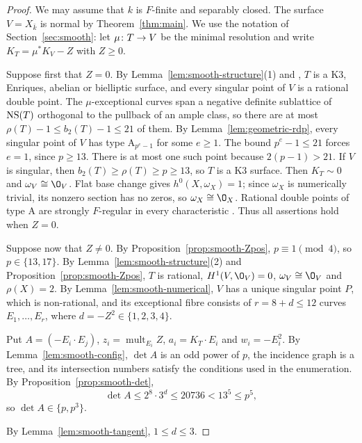 \begin{proof}
We may assume that $k$ is $F$-finite and separably closed.
The surface $V = X_{\bar k}$ is normal by Theorem~\ref{thm:main}.
We use the notation of Section~\ref{sec:smooth}: let $\mu\colon T\to V$ be the minimal resolution and write $K_T = \mu^*K_V-Z$ with $Z\geq 0$.

Suppose first that $Z = 0$.
By Lemma~\ref{lem:smooth-structure}(1) and \cite{BM77}, $T$ is a K3, Enriques, abelian or bielliptic surface, and every singular point of $V$ is a rational double point.
The $\mu$-exceptional curves span a negative definite sublattice of $\operatorname{NS}(T)$ orthogonal to the pullback of an ample class, so there are at most $\rho(T)-1\leq b_2(T)-1\leq 21$ of them.
By Lemma~\ref{lem:geometric-rdp}, every singular point of $V$ has type $\mathrm A_{p^e-1}$ for some $e\geq 1$.
The bound $p^e-1\leq 21$ forces $e = 1$, since $p\geq 13$.
There is at most one such point because $2(p-1)>21$.
If $V$ is singular, then $b_2(T)\geq\rho(T)\geq p\geq 13$, so $T$ is a K3 surface.
Then $K_T\sim 0$ and $\omega_V\cong\O_V$.
Flat base change gives $h^0(X,\omega_X) = 1$; since $\omega_X$ is numerically trivial, its nonzero section has no zeros, so $\omega_X\cong\O_X$.
Rational double points of type $\mathrm A$ are strongly $F$-regular in every characteristic \cite[Theorem~1.1]{Har98}.
Thus all assertions hold when $Z = 0$.

Suppose now that $Z\neq 0$.
By Proposition~\ref{prop:smooth-Zpos}, $p\equiv 1\pmod 4$, so $p\in\{13,17\}$.
By Lemma~\ref{lem:smooth-structure}(2) and Proposition~\ref{prop:smooth-Zpos}, $T$ is rational, $H^1(V,\O_V) = 0$, $\omega_V\cong\O_V$ and $\rho(X) = 2$.
By Lemma~\ref{lem:smooth-numerical}, $V$ has a unique singular point $P$, which is non-rational, and its exceptional fibre consists of $r = 8+d\leq 12$ curves $E_1,\dots,E_r$, where $d = -Z^2\in\{1,2,3,4\}$.

Put $A = (-E_i\cdot E_j)$, $z_i = \operatorname{mult}_{E_i}Z$, $a_i = K_T\cdot E_i$ and $w_i = -E_i^2$.
By Lemma~\ref{lem:smooth-config}, $\det A$ is an odd power of $p$, the incidence graph is a tree, and its intersection numbers satisfy the conditions used in the enumeration.
By Proposition~\ref{prop:smooth-det},
\[
  \det A\leq 2^8\cdot 3^d\leq 20736<13^5\leq p^5,
\]
so $\det A\in\{p,p^3\}$.

By Lemma~\ref{lem:smooth-tangent}, $1\leq d\leq 3$.


\end{proof}
